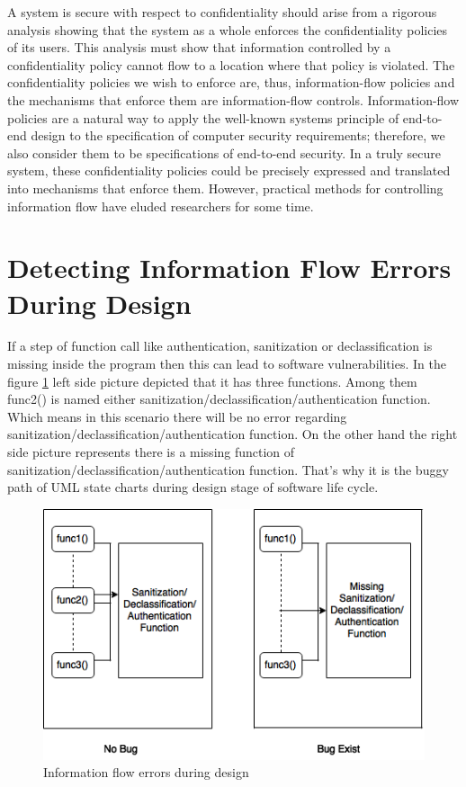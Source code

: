 A system is secure with respect to confidentiality
should arise from a rigorous analysis showing that the system
as a whole enforces the confidentiality policies of its users.
This analysis must show that information controlled by a confidentiality policy cannot flow to a location where that policy
is violated. The confidentiality policies we wish to enforce
are, thus, information-flow policies and the mechanisms that
enforce them are information-flow controls. Information-flow
policies are a natural way to apply the well-known systems
principle of end-to-end design \cite{ref_89_saltzer1984end} to the specification of
computer security requirements; therefore, we also consider
them to be specifications of end-to-end security. In a truly
secure system, these confidentiality policies could be precisely
expressed and translated into mechanisms that enforce them.
However, practical methods for controlling information flow
have eluded researchers for some time.

\section{ Detecting Information Flow Errors During Design}
If a step of function call like authentication, sanitization or declassification is missing inside the program then this can lead to software vulnerabilities. In the figure \ref{figure_FunctionCallMissing} left side picture depicted that it has three functions. Among them func2() is named either sanitization/declassification/authentication function. Which means in this scenario there will be no error regarding sanitization/declassification/authentication function. On the other hand the right side picture represents there is a missing function of sanitization/declassification/authentication function. That's why it is the buggy path of UML state charts during design stage of software life cycle. 
\begin{figure}[htbp]
	\centering
	\includegraphics{styles/FunctionCallMissing.png}
	\caption{Information flow errors during design}
	\label{figure_FunctionCallMissing}
\end{figure}


